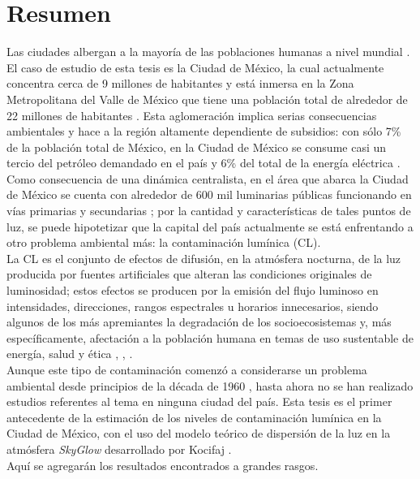 \chapter{Resumen}

Las ciudades albergan a la mayoría de las poblaciones humanas a nivel mundial \citep{Zari2018}. El caso de estudio de esta tesis es la Ciudad de México, la cual actualmente concentra cerca de 9 millones de habitantes \citep{INEGI2015} y está inmersa en la Zona Metropolitana del Valle de México que tiene una población total de alrededor de 22 millones de habitantes \citep{OCDE2015}. Esta aglomeración implica serias consecuencias ambientales y hace a la región altamente dependiente de subsidios: con sólo 7\% de la población total de México, en la Ciudad de México se consume casi un tercio del petróleo demandado en el país y 6\% del total de la energía eléctrica \citep{SENER2013}.\\

Como consecuencia de una dinámica centralista, en el área que abarca la Ciudad de México se cuenta con alrededor de 600 mil luminarias públicas funcionando en vías primarias y secundarias \citep{INFO2019}; por la cantidad y características de tales puntos de luz, se puede hipotetizar que la capital del país actualmente se está enfrentando a otro problema ambiental más: la contaminación lumínica (CL).\\

La CL es el conjunto de efectos de difusión, en la atmósfera nocturna, de la luz producida por fuentes artificiales que alteran las condiciones originales de luminosidad; estos efectos se producen por la emisión del flujo luminoso en intensidades, direcciones, rangos espectrales u horarios innecesarios, siendo algunos de los más apremiantes la degradación de los socioecosistemas y, más específicamente, afectación a la población humana en temas de uso sustentable de energía, salud y ética \citep{AtlasREPSA}, \citep{LibroCL}, \citep{Stone2017}.\\

Aunque este tipo de contaminación comenzó a considerarse un problema ambiental desde principios de la década de 1960 \citep{LibroCL}, hasta ahora no se han realizado estudios referentes al tema en ninguna ciudad del país. Esta tesis es el primer antecedente de la estimación de los niveles de contaminación lumínica en la Ciudad de México, con el uso del modelo teórico de dispersión de la luz en la atmósfera \textit{SkyGlow} desarrollado por Kocifaj \citep{Kocifaj2007}.\\

Aquí se agregarán los resultados encontrados a grandes rasgos.

